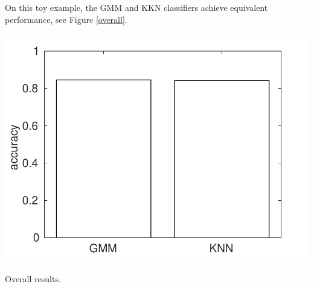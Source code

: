 \documentclass[12pt,a4paper,fleqn]{tufte-handout}
\begin{document}
On this toy example, the GMM  and KKN classifiers achieve equivalent performance, see Figure \ref{overall}.

\begin{marginfigure}
\includegraphics[width=\textwidth]{figures/overall}
\caption{Overall results.}
\label{overall}
\end{marginfigure}
  
  
  
 
 
  
\end{document}
